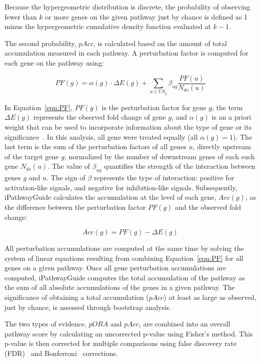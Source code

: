 Because the hypergeometric distribution is discrete, the probability of observing fewer than $k$ or more genes on the given pathway just by chance is defined as 1 minus  the hypergeometric cumulative density function evaluated at $k-1$.

The second probability, $pAcc$, is calculated based on the amount of total accumulation measured in each pathway. A perturbation factor is computed for each gene on the pathway using:

\begin{equation}
\label{eqn:PF}
PF(g) = \alpha(g) \cdot \Delta E(g) + \sum_{u \in US_g} \beta_{ug}\frac{PF(u)}{N_{ds}(u)}
\end{equation}


In Equation~\ref{eqn:PF}, $PF(g)$ is the perturbation factor for gene $g$, the term $\Delta E(g)$ represents the observed fold change of gene $g$, and $\alpha(g)$ is an a priori weight that can be used to incorporate information about the type of gene or its significance~\cite{voichita2012incorporating}. In this analysis, all gene were treated equally (all $\alpha(g)=1$). The last term is the sum of the perturbation factors of all genes $u$, directly upstream of the target gene $g$, normalized by the number of downstream genes of each such gene $N_{ds}(u)$. The value of $\beta_{ug}$ quantifies the strength of the interaction between genes $g$ and $u$. The sign of $\beta$ represents the type of interaction: positive for activation-like signals, and negative for inhibition-like signals. Subsequently, iPathwayGuide calculates the accumulation at the level of each gene, $Acc(g)$, as the difference between the perturbation factor $PF(g)$ and the observed fold change:

\begin{equation}
Acc(g) = PF(g) - \Delta E(g)
\label{eqn:acc}
\end{equation}

All perturbation accumulations are computed at the same time by solving the system of linear equations resulting from combining Equation~\ref{eqn:PF} for all genes on a given pathway. Once all gene perturbation accumulations are computed, iPathwayGuide computes the total accumulation of the pathway as the sum of all absolute accumulations of the genes in a given pathway. The significance of obtaining a total accumulation ($pAcc$) at least as large as observed, just by chance, is assessed through bootstrap analysis.

The two types of evidence, $pORA$ and $pAcc$, are combined into an overall pathway score by calculating an uncorrected p-value using Fisher's method. This p-value is then corrected for multiple comparisons using false discovery rate (FDR)~\cite{Benjamini:1995,  Benjamini:2001} and Bonferroni~\cite{Bonferroni:1935} corrections. 

